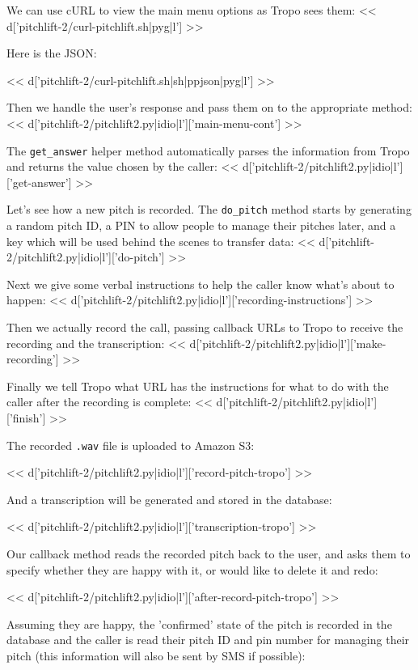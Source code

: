 \documentclass[custom, plainsections]{sciposter}
\begin{document}
\begin{multicols*}{2}
We can use cURL to view the main menu options as Tropo sees them:
<< d['pitchlift-2/curl-pitchlift.sh|pyg|l'] >>

Here is the JSON:

<< d['pitchlift-2/curl-pitchlift.sh|sh|ppjson|pyg|l'] >>

Then we handle the user's response and pass them on to the appropriate method:
<< d['pitchlift-2/pitchlift2.py|idio|l']['main-menu-cont'] >>

The \verb|get_answer| helper method automatically parses the information from Tropo and returns the value chosen by the caller:
<< d['pitchlift-2/pitchlift2.py|idio|l']['get-answer'] >>

Let's see how a new pitch is recorded. The \verb|do_pitch| method starts by generating a random pitch ID, a PIN to allow people to manage their pitches later, and a key which will be used behind the scenes to transfer data:
<< d['pitchlift-2/pitchlift2.py|idio|l']['do-pitch'] >>

Next we give some verbal instructions to help the caller know what's about to happen:
<< d['pitchlift-2/pitchlift2.py|idio|l']['recording-instructions'] >>

Then we actually record the call, passing callback URLs to Tropo to receive the recording and the transcription:
<< d['pitchlift-2/pitchlift2.py|idio|l']['make-recording'] >>

Finally we tell Tropo what URL has the instructions for what to do with the caller after the recording is complete:
<< d['pitchlift-2/pitchlift2.py|idio|l']['finish'] >>

The recorded \verb|.wav| file is uploaded to Amazon S3:

<< d['pitchlift-2/pitchlift2.py|idio|l']['record-pitch-tropo'] >>

And a transcription will be generated and stored in the database:

<< d['pitchlift-2/pitchlift2.py|idio|l']['transcription-tropo'] >>

Our callback method reads the recorded pitch back to the user, and asks them to specify whether they are happy with it, or would like to delete it and redo:

<< d['pitchlift-2/pitchlift2.py|idio|l']['after-record-pitch-tropo'] >>

Assuming they are happy, the 'confirmed' state of the pitch is recorded in the database and the caller is read their pitch ID and pin number for managing their pitch (this information will also be sent by SMS if possible):


\end{multicols*}
\end{document}
